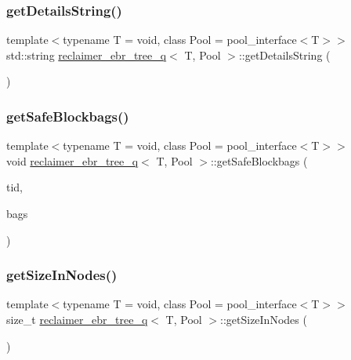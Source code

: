 \subsubsection{\texorpdfstring{get\+Details\+String()}{getDetailsString()}}
{\footnotesize\ttfamily template$<$typename T  = void, class Pool  = pool\+\_\+interface$<$\+T$>$$>$ \\
std\+::string \hyperlink{classreclaimer__ebr__tree__q}{reclaimer\+\_\+ebr\+\_\+tree\+\_\+q}$<$ T, Pool $>$\+::get\+Details\+String (\begin{DoxyParamCaption}{ }\end{DoxyParamCaption})\hspace{0.3cm}{\ttfamily [inline]}}

\mbox{\label{classreclaimer__ebr__tree__q_a20c18f89048520313881e48aea56d346}} 
\subsubsection{\texorpdfstring{get\+Safe\+Blockbags()}{getSafeBlockbags()}}
{\footnotesize\ttfamily template$<$typename T  = void, class Pool  = pool\+\_\+interface$<$\+T$>$$>$ \\
void \hyperlink{classreclaimer__ebr__tree__q}{reclaimer\+\_\+ebr\+\_\+tree\+\_\+q}$<$ T, Pool $>$\+::get\+Safe\+Blockbags (\begin{DoxyParamCaption}\item[{const int}]{tid,  }\item[{\hyperlink{classblockbag}{blockbag}$<$ T $>$ $\ast$$\ast$}]{bags }\end{DoxyParamCaption})\hspace{0.3cm}{\ttfamily [inline]}}

\mbox{\label{classreclaimer__ebr__tree__q_a7dd15de4e2b702ddcc726beb6f5aea03}} 
\subsubsection{\texorpdfstring{get\+Size\+In\+Nodes()}{getSizeInNodes()}}
{\footnotesize\ttfamily template$<$typename T  = void, class Pool  = pool\+\_\+interface$<$\+T$>$$>$ \\
size\+\_\+t \hyperlink{classreclaimer__ebr__tree__q}{reclaimer\+\_\+ebr\+\_\+tree\+\_\+q}$<$ T, Pool $>$\+::get\+Size\+In\+Nodes (\begin{DoxyParamCaption}{ }\end{DoxyParamCaption})\hspace{0.3cm}{\ttfamily [inline]}}

